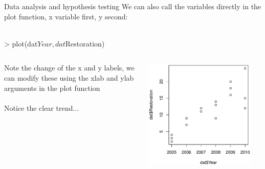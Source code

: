 \documentclass[xcolor=svgnames]{beamer}
\begin{document}
\begin{frame}[fragile]{Data analysis and hypothesis testing}
We can also call the variables directly in the plot function, x variable first, y second:\\~\\
\begin{Schunk}
\begin{Sinput}
> plot(dat$Year,dat$Restoration)
\end{Sinput}
\end{Schunk}
\vspace{-0.13in}
\begin{columns}
\begin{column}{0.5\textwidth}
Note the change of the x and y labels, we can modify these using the xlab and ylab arguments in the plot function\\~\\
Notice the clear trend...
\end{column}
\begin{column}{0.5\textwidth}
\begin{center}
\includegraphics[width=0.9\textwidth]{R_for_data_analysis-reg2.pdf}
\end{center}
\end{column}
\end{columns}
\end{frame}
\end{document}
